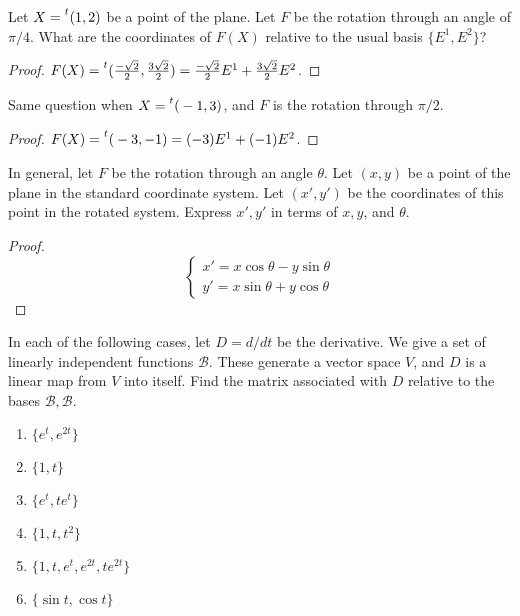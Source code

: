 \begin{exercise}
    Let $X = \prescript{t}{}(1, 2)$ be a point of the plane. Let $F$ be the rotation through an angle of $\pi/4$. What are the coordinates of $F(X)$ relative to the usual basis $\{ E^{1}, E^{2} \}$?
\end{exercise}

\begin{proof}
    $F(X) = \prescript{t}{}(\frac{-\sqrt{2}}{2}, \frac{3\sqrt{2}}{2}) = \frac{-\sqrt{2}}{2}E^{1} + \frac{3\sqrt{2}}{2}E^{2}$.
\end{proof}

\begin{exercise}
    Same question when $X = \prescript{t}{}(-1, 3)$, and $F$ is the rotation through $\pi/2$.
\end{exercise}

\begin{proof}
    $F(X) = \prescript{t}{}(-3, -1) = (-3)E^{1} + (-1)E^{2}$.
\end{proof}

\begin{exercise}
    In general, let $F$ be the rotation through an angle $\theta$. Let $(x, y)$ be a point of the plane in the standard coordinate system. Let $(x', y')$ be the coordinates of this point in the rotated system. Express $x', y'$ in terms of $x, y$, and $\theta$.
\end{exercise}

\begin{proof}
    \[
        \begin{cases}
            x' = x\cos\theta - y\sin\theta \\
            y' = x\sin\theta + y\cos\theta
        \end{cases}
    \]
\end{proof}

\begin{exercise}
    In each of the following cases, let $D = d/dt$ be the derivative. We give a set of linearly independent functions $\mathscr{B}$. These generate a vector space $V$, and $D$ is a linear map from $V$ into itself. Find the matrix associated with $D$ relative to the bases $\mathscr{B}, \mathscr{B}$.
    \begin{enumerate}[label={(\alph*)}]
        \item $\{ e^{t}, e^{2t} \}$
        \item $\{ 1, t \}$
        \item $\{ e^{t}, te^{t} \}$
        \item $\{ 1, t, t^{2} \}$
        \item $\{ 1, t, e^{t}, e^{2t}, te^{2t} \}$
        \item $\{ \sin t, \cos t \}$
    \end{enumerate}
\end{exercise}

